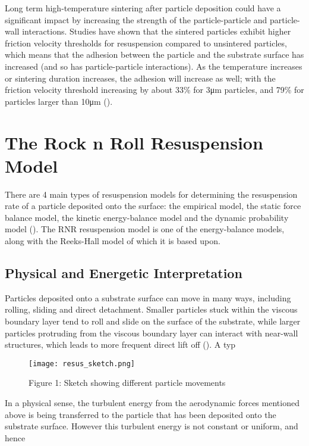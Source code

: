 \documentclass{article}
\begin{document}
Long term high-temperature sintering after particle deposition could have a significant impact by increasing the strength of the particle-particle and particle-wall interactions. Studies have shown that the sintered particles exhibit higher friction velocity thresholds for resuspension compared to unsintered particles, which means that the adhesion between the particle and the substrate surface has increased (and so has particle-particle interactions). As the temperature increases or sintering duration increases, the adhesion will increase as well; with the friction velocity threshold increasing by about 33\% for 3μm particles, and 79\% for particles larger than 10μm (\cite{Zhao20252954}). 



\section{The Rock n Roll Resuspension Model}

There are 4 main types of resuspension models for determining the resuspension rate of a particle deposited onto the surface: the empirical model, the static force balance model, the kinetic energy-balance model and the dynamic probability model (\cite{HU2023}). The RNR resuspension model is one of the energy-balance models, along with the Reeks-Hall model of which it is based upon. 

\subsection{Physical and Energetic Interpretation}

Particles deposited onto a substrate surface can move in many ways, including rolling, sliding and direct detachment. Smaller particles stuck within the viscous boundary layer tend to roll and slide on the surface of the substrate, while larger particles protruding from the viscous boundary layer can interact with near-wall structures, which leads to more frequent direct lift off (\cite{henry2018}). A typ

\begin{figure}
    \centering
    \texttt{[image: resus\_sketch.png]}
    \caption{Figure 1: Sketch showing different particle movements}
    \label{fig:1}
\end{figure}

In a physical sense, the turbulent energy from the aerodynamic forces mentioned above is being transferred to the particle that has been deposited onto the substrate surface. However this turbulent energy is not constant or uniform, and hence 
\end{document}
